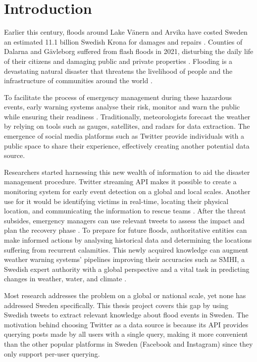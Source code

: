 \chapter{Introduction}\label{sec:introduction}

Earlier this century, floods around Lake Vänern and Arvika have costed Sweden an estimated 11.1
billion Swedish Krona for damages and repairs \cite{RiverFloodsSweden2022}. Counties of Dalarna and
Gävleborg suffered from flash floods in 2021, disturbing the daily life of their citizens and
damaging public and private properties \cite{daviesSwedenFlashFloods2021}. Flooding is a devastating
natural disaster that threatens the livelihood of people and the infrastructure of communities
around the world \cite{Floodlist2021}.

To facilitate the process of emergency management during these hazardous events, early warning
systems analyse their risk, monitor and warn the public while ensuring their readiness
\cite{contributorsEarlyWarningSystem2022}. Traditionally, meteorologists forecast the weather by
relying on tools such as gauges, satellites, and radars for data extraction. The emergence of social
media platforms such as Twitter provide individuals with a public space to share their experience,
effectively creating another potential data source.

Researchers started harnessing this new wealth of information to aid the disaster management
procedure. Twitter streaming \ac{API} makes it possible to create a monitoring system for early
event detection on a global \cite{debruijnGlobalDatabaseHistoric2019b} and local
\cite{barkerDevelopmentNationalscaleRealtime2019} scales. Another use for it would be identifying
victims in real-time, locating their physical location, and communicating the information to rescue
teams \cite{singhEventClassificationLocation2019}. After the threat subsides, emergency managers can
use relevant tweets to assess the impact and plan the recovery phase
\cite{barkerDevelopmentNationalscaleRealtime2019}. To prepare for future floods, authoritative
entities can make informed actions by analysing historical data and determining the locations
suffering from recurrent calamities. This newly acquired knowledge can augment weather warning
systems' pipelines improving their accuracies such as \ac{SMHI}, a Swedish expert authority with a
global perspective and a vital task in predicting changes in weather, water, and climate
\cite{SMHI2021}.

Most research addresses the problem on a global or national scale, yet none has addressed Sweden
specifically. This thesis project covers this gap by using Swedish tweets to extract relevant
knowledge about flood events in Sweden. The motivation behind choosing Twitter as a data source is
because its \ac{API} provides querying posts made by all users with a single query, making it more
convenient than the other popular platforms in Sweden (Facebook and Instagram) since they only
support per-user querying.

